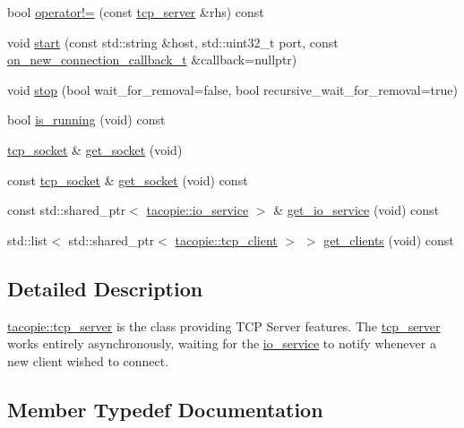 \begin{DoxyCompactItemize}
\item 
bool \hyperlink{classtacopie_1_1tcp__server_aa45611b77d60b536aeaf626d1724342d}{operator!=} (const \hyperlink{classtacopie_1_1tcp__server}{tcp\+\_\+server} \&rhs) const
\item 
void \hyperlink{classtacopie_1_1tcp__server_a6cb98b50d865b32dba497273a0eca1e9}{start} (const std\+::string \&host, std\+::uint32\+\_\+t port, const \hyperlink{classtacopie_1_1tcp__server_a103cb4e6fcab00f88a708aabd38b66ff}{on\+\_\+new\+\_\+connection\+\_\+callback\+\_\+t} \&callback=nullptr)
\item 
void \hyperlink{classtacopie_1_1tcp__server_abc099e162432e2218faed93fc84180fd}{stop} (bool wait\+\_\+for\+\_\+removal=false, bool recursive\+\_\+wait\+\_\+for\+\_\+removal=true)
\item 
bool \hyperlink{classtacopie_1_1tcp__server_a76162141e6443953f3ad8e11c4e4d3d7}{is\+\_\+running} (void) const
\item 
\hyperlink{classtacopie_1_1tcp__socket}{tcp\+\_\+socket} \& \hyperlink{classtacopie_1_1tcp__server_a39a51b9203d42babfd9c4c1a0f4cc340}{get\+\_\+socket} (void)
\item 
const \hyperlink{classtacopie_1_1tcp__socket}{tcp\+\_\+socket} \& \hyperlink{classtacopie_1_1tcp__server_a373aec294e24a52c3ef6c44920af36e2}{get\+\_\+socket} (void) const
\item 
const std\+::shared\+\_\+ptr$<$ \hyperlink{classtacopie_1_1io__service}{tacopie\+::io\+\_\+service} $>$ \& \hyperlink{classtacopie_1_1tcp__server_aace4796627b6abccccce1a541908414f}{get\+\_\+io\+\_\+service} (void) const
\item 
std\+::list$<$ std\+::shared\+\_\+ptr$<$ \hyperlink{classtacopie_1_1tcp__client}{tacopie\+::tcp\+\_\+client} $>$ $>$ \hyperlink{classtacopie_1_1tcp__server_ab98d0a169bda6915dd46f1cd117d37a6}{get\+\_\+clients} (void) const
\end{DoxyCompactItemize}


\subsection{Detailed Description}
\hyperlink{classtacopie_1_1tcp__server}{tacopie\+::tcp\+\_\+server} is the class providing T\+CP Server features. The \hyperlink{classtacopie_1_1tcp__server}{tcp\+\_\+server} works entirely asynchronously, waiting for the \hyperlink{classtacopie_1_1io__service}{io\+\_\+service} to notify whenever a new client wished to connect. 

\subsection{Member Typedef Documentation}
\mbox{\label{classtacopie_1_1tcp__server_a103cb4e6fcab00f88a708aabd38b66ff}} 
